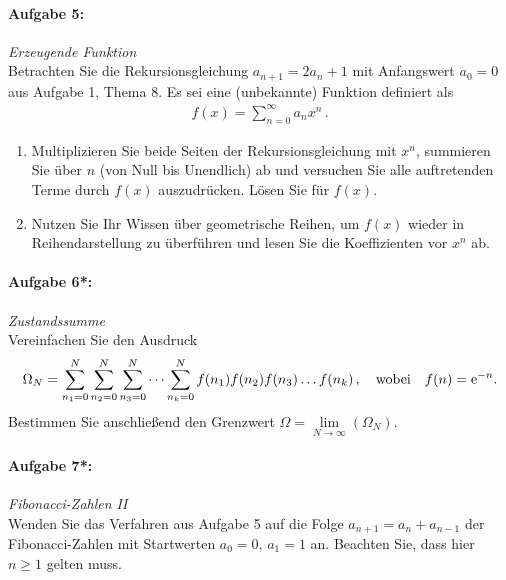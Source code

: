 \paragraph{Aufgabe 5: } \emph{Erzeugende Funktion}\\[0.2cm]
Betrachten Sie die Rekursionsgleichung $a_{n+1}=2a_n+1$ mit Anfangswert $a_0=0$ aus Aufgabe 1, Thema 8. Es sei eine (unbekannte) Funktion definiert als
\begin{align*}
f(x)=\sum\limits_{n=0}^\infty a_n x^n\,.
\end{align*}
\begin{enumerate}[label=(\alph*)]
\item Multiplizieren Sie beide Seiten der Rekursionsgleichung mit $x^n$, summieren Sie über $n$ (von Null bis Unendlich) ab und versuchen Sie alle auftretenden Terme durch $f(x)$ auszudrücken. Lösen Sie für $f(x)$.
\item Nutzen Sie Ihr Wissen über geometrische Reihen, um $f(x)$ wieder in Reihendarstellung zu überführen und lesen Sie die Koeffizienten vor $x^n$ ab.
\end{enumerate}
%
\paragraph{Aufgabe 6*: } \emph{Zustandssumme}\\[0.2cm]
Vereinfachen Sie den Ausdruck
\begin{align*}
\Omega_N=\sum\limits_{n_1=0}^N\sum\limits_{n_2=0}^N\sum\limits_{n_3=0}^N\dots\sum\limits_{n_k=0}^N f(n_1)f(n_2)f(n_3)\dots f(n_k)\,, \qq{wobei}f(n)=\e^{-n}.
\end{align*}
Bestimmen Sie anschließend den Grenzwert $\Omega=\lim\limits_{N\rightarrow\infty}(\Omega_N)$.
%
\paragraph{Aufgabe 7*: } \emph{Fibonacci-Zahlen II}\\[0.2cm]
Wenden Sie das Verfahren aus Aufgabe 5 auf die Folge $a_{n+1}=a_n+a_{n-1}$ der Fibonacci-Zahlen mit Startwerten $a_0=0$, $a_1=1$ an. Beachten Sie, dass hier $n\ge 1$ gelten muss.
%